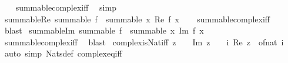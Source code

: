 \begin{isabellebody}
%
\isadelimproof
\ \ %
\endisadelimproof
%
\isatagproof
{}\isamarkupfalse%
\ summable{\isacharunderscore}{\kern0pt}complex{\isacharunderscore}{\kern0pt}iff\ \isamarkupfalse%
\ simp%
\endisatagproof
{\isafoldproof}%
%
\isadelimproof
\isanewline
%
\endisadelimproof
\isanewline
{}\isamarkupfalse%
\ summable{\isacharunderscore}{\kern0pt}Re{\isacharcolon}{\kern0pt}\ {\isachardoublequoteopen}summable\ f\ {\isasymLongrightarrow}\ summable\ {\isacharparenleft}{\kern0pt}{\isasymlambda}x{\isachardot}{\kern0pt}\ Re\ {\isacharparenleft}{\kern0pt}f\ x{\isacharparenright}{\kern0pt}{\isacharparenright}{\kern0pt}{\isachardoublequoteclose}\isanewline
%
\isadelimproof
\ \ %
\endisadelimproof
%
\isatagproof
{}\isamarkupfalse%
\ summable{\isacharunderscore}{\kern0pt}complex{\isacharunderscore}{\kern0pt}iff\ \isamarkupfalse%
\ blast%
\endisatagproof
{\isafoldproof}%
%
\isadelimproof
\isanewline
%
\endisadelimproof
\isanewline
{}\isamarkupfalse%
\ summable{\isacharunderscore}{\kern0pt}Im{\isacharcolon}{\kern0pt}\ {\isachardoublequoteopen}summable\ f\ {\isasymLongrightarrow}\ summable\ {\isacharparenleft}{\kern0pt}{\isasymlambda}x{\isachardot}{\kern0pt}\ Im\ {\isacharparenleft}{\kern0pt}f\ x{\isacharparenright}{\kern0pt}{\isacharparenright}{\kern0pt}{\isachardoublequoteclose}\isanewline
%
\isadelimproof
\ \ %
\endisadelimproof
%
\isatagproof
{}\isamarkupfalse%
\ summable{\isacharunderscore}{\kern0pt}complex{\isacharunderscore}{\kern0pt}iff\ \isamarkupfalse%
\ blast%
\endisatagproof
{\isafoldproof}%
%
\isadelimproof
\isanewline
%
\endisadelimproof
\isanewline
{}\isamarkupfalse%
\ complex{\isacharunderscore}{\kern0pt}is{\isacharunderscore}{\kern0pt}Nat{\isacharunderscore}{\kern0pt}iff{\isacharcolon}{\kern0pt}\ {\isachardoublequoteopen}z\ {\isasymin}\ {\isasymnat}\ {\isasymlongleftrightarrow}\ Im\ z\ {\isacharequal}{\kern0pt}\ {}\ {\isasymand}\ {\isacharparenleft}{\kern0pt}{\isasymexists}i{\isachardot}{\kern0pt}\ Re\ z\ {\isacharequal}{\kern0pt}\ of{\isacharunderscore}{\kern0pt}nat\ i{\isacharparenright}{\kern0pt}{\isachardoublequoteclose}\isanewline
%
\isadelimproof
\ \ %
\endisadelimproof
%
\isatagproof
{}\isamarkupfalse%
\ {\isacharparenleft}{\kern0pt}auto\ simp{\isacharcolon}{\kern0pt}\ Nats{\isacharunderscore}{\kern0pt}def\ complex{\isacharunderscore}{\kern0pt}eq{\isacharunderscore}{\kern0pt}iff{\isacharparenright}{\kern0pt}%
\endisatagproof
{\isafoldproof}%
%
\isadelimproof
\isanewline
%
\endisadelimproof

\end{isabellebody}

